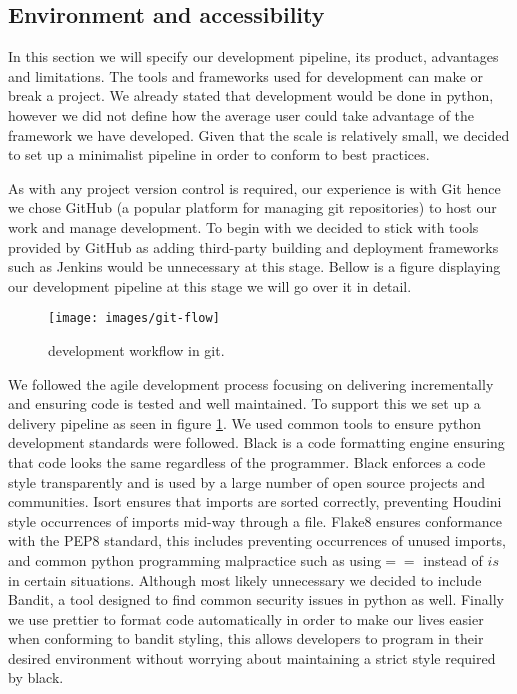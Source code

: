 \subsection{Environment and accessibility}
In this section we will specify our development pipeline, its product, advantages and limitations. The tools and frameworks used for development can make or break a project. We already stated that development would be done in python, however we did not define how the average user could take advantage of the framework we have developed. Given that the scale is relatively small, we decided to set up a minimalist pipeline in order to conform to best practices.  

As with any project version control is required, our experience is with Git hence we chose GitHub (a popular platform for managing git repositories) to host our work and manage development. To begin with we decided to stick with tools provided by GitHub as adding third-party building and deployment frameworks such as Jenkins would be unnecessary at this stage. Bellow is a figure displaying our development pipeline at this stage we will go over it in detail.

\begin{figure}[h]
\centering
 \texttt{[image: images/git-flow]}
 \caption{development workflow in git.}
 \label{fig:git-flow}
\end{figure}
\newpage
We followed the agile development process focusing on delivering incrementally and ensuring code is tested and well maintained. To support this we set up a delivery pipeline as seen in figure \ref{fig:git-flow}. We used common tools to ensure python development standards were followed. Black is a code formatting engine ensuring that code looks the same regardless of the programmer. Black enforces a code style transparently and is used by a large number of open source projects and communities. Isort ensures that imports are sorted correctly, preventing Houdini style occurrences of imports mid-way through a file. Flake8 ensures conformance with the PEP8 standard, this includes preventing occurrences of unused imports, and common python programming malpractice such as using\(==\) instead of \(is\) in certain situations. Although most likely unnecessary we decided to include Bandit, a tool designed to find common security issues in python as well. Finally we use prettier to format code automatically in order to make our lives easier when conforming to bandit styling, this allows developers to program in their desired environment without worrying about maintaining a strict style required by black.

